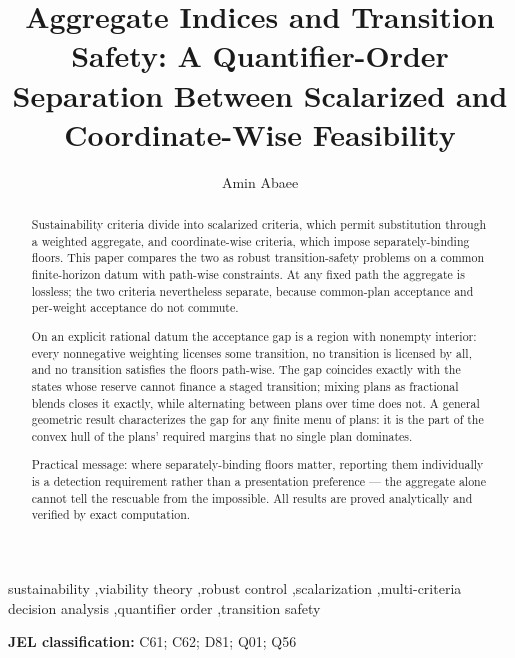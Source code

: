 \documentclass[review,11pt]{elsarticle}
\providecommand{\jel}[1]{\par\noindent\textbf{JEL classification:} #1\par}
\begin{document}
\begin{frontmatter}

\title{Aggregate Indices and Transition Safety: A Quantifier-Order Separation Between Scalarized and Coordinate-Wise Feasibility}

\author[aff]{Amin Abaee}

\address[aff]{Independent Researcher, \href{https://orcid.org/0000-0002-0019-1842}{ORCID: 0000-0002-0019-1842}, \href{mailto:amin\_abaee@ut.ac.ir}{amin\_abaee@ut.ac.ir}}

\begin{abstract}

Sustainability criteria divide into scalarized criteria, which permit
substitution through a weighted aggregate, and coordinate-wise criteria,
which impose separately-binding floors. This paper compares the two as
robust transition-safety problems on a common finite-horizon datum with
path-wise constraints. At any fixed path the aggregate is lossless; the
two criteria nevertheless separate, because common-plan acceptance and
per-weight acceptance do not commute.

On an explicit rational datum the acceptance gap is a region with
nonempty interior: every nonnegative weighting licenses some transition,
no transition is licensed by all, and no transition satisfies the floors
path-wise. The gap coincides exactly with the states whose reserve
cannot finance a staged transition; mixing plans as fractional blends
closes it exactly, while alternating between plans over time does not.
A general geometric result characterizes the gap for any finite menu of
plans: it is the part of the convex hull of the plans' required margins
that no single plan dominates.

Practical message: where separately-binding floors matter, reporting
them individually is a detection requirement rather than a presentation
preference --- the aggregate alone cannot tell the rescuable from the
impossible. All results are proved analytically and verified by exact
computation.

\end{abstract}

\begin{keyword}
sustainability \sep viability theory \sep robust control \sep scalarization \sep multi-criteria decision analysis \sep quantifier order \sep transition safety
\end{keyword}

\jel{C61; C62; D81; Q01; Q56}


\end{frontmatter}
\end{document}
